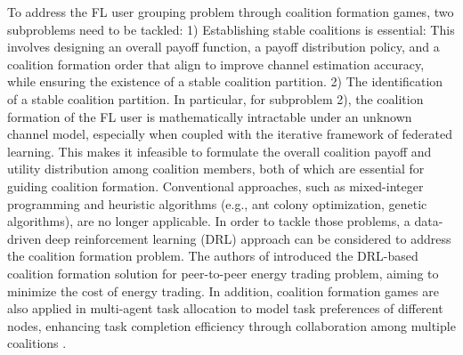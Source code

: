 To address the FL user grouping problem through coalition formation games, two subproblems need to be tackled: 1) Establishing   stable coalitions  is essential: This involves  designing an overall payoff function, a payoff distribution policy, and a coalition formation order that align to improve channel estimation accuracy, while ensuring the existence of a stable coalition partition. 2) The identification of a stable coalition partition. 
In particular, for subproblem 2),  the coalition formation of the FL user 
is mathematically intractable  under an unknown channel model, especially when coupled with the iterative framework of federated learning. This makes it infeasible to formulate the overall coalition payoff  and utility   distribution among coalition members, both of which are essential for guiding coalition formation. 
Conventional   approaches, such as mixed-integer programming and heuristic algorithms (e.g., ant colony optimization, genetic algorithms), are no longer applicable.  In order to tackle those problems, a data-driven deep reinforcement learning (DRL) approach can be considered to address the coalition formation problem. 
The authors of \cite{RL_CL_1} introduced the DRL-based coalition formation solution for peer-to-peer energy trading problem, aiming to minimize the cost of energy trading. In addition, coalition formation games are also applied in multi-agent task allocation to model task preferences of different nodes, enhancing task completion efficiency through collaboration among multiple coalitions \cite{RL_CL_2,RL_CL_3}. 



\vspace{-1.2em}
